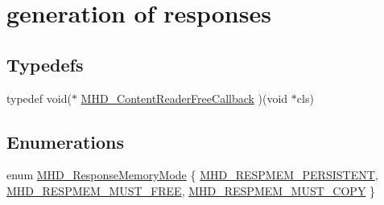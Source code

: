 \hypertarget{group__response}{\section{generation of responses}
\label{group__response}
}
\subsection*{\-Typedefs}
\begin{DoxyCompactItemize}
\item 
typedef void($\ast$ \hyperlink{group__response_gae678e9aeb43b374f595d082737b68272}{\-M\-H\-D\-\_\-\-Content\-Reader\-Free\-Callback} )(void $\ast$cls)
\end{DoxyCompactItemize}
\subsection*{\-Enumerations}
\begin{DoxyCompactItemize}
\item 
enum \hyperlink{group__response_ga82593e08ec5cd3fe305590c804c4649d}{\-M\-H\-D\-\_\-\-Response\-Memory\-Mode} \{ \hyperlink{group__response_gga82593e08ec5cd3fe305590c804c4649da58a8a36e332f4e917cfa41592d3a833e}{\-M\-H\-D\-\_\-\-R\-E\-S\-P\-M\-E\-M\-\_\-\-P\-E\-R\-S\-I\-S\-T\-E\-N\-T}, 
\hyperlink{group__response_gga82593e08ec5cd3fe305590c804c4649da4ce2aa454f6162a95426d130526acc60}{\-M\-H\-D\-\_\-\-R\-E\-S\-P\-M\-E\-M\-\_\-\-M\-U\-S\-T\-\_\-\-F\-R\-E\-E}, 
\hyperlink{group__response_gga82593e08ec5cd3fe305590c804c4649da663dcabf6be3469930bb281d5d396b3a}{\-M\-H\-D\-\_\-\-R\-E\-S\-P\-M\-E\-M\-\_\-\-M\-U\-S\-T\-\_\-\-C\-O\-P\-Y}
 \}
\end{DoxyCompactItemize}
